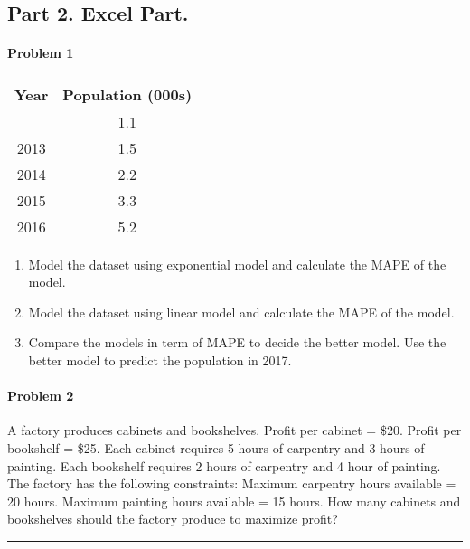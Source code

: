 \documentclass[
  letterpaper,
  DIV=11,
  numbers=noendperiod]{scrartcl}
\let\oldparagraph\paragraph
\renewcommand{\paragraph}[1]{\oldparagraph{#1}\mbox{}}
\providecommand{\tightlist}{%
  \setlength{\itemsep}{0pt}\setlength{\parskip}{0pt}}\usepackage{longtable,booktabs,array}
\begin{document}
\pagebreak

\subsection{Part 2. Excel Part.}\label{part-2.-excel-part.}

\paragraph{Problem 1}\label{problem-1}

\begin{longtable}[]{@{}cc@{}}
\toprule\noalign{}
Year & Population (000s) \\
\midrule\noalign{}
\endhead
\bottomrule\noalign{}
\endlastfoot
2012 & 1.1 \\
2013 & 1.5 \\
2014 & 2.2 \\
2015 & 3.3 \\
2016 & 5.2 \\
\end{longtable}

\begin{enumerate}
\def\labelenumi{\arabic{enumi}.}
\tightlist
\item
  Model the dataset using exponential model and calculate the MAPE of
  the model.
\item
  Model the dataset using linear model and calculate the MAPE of the
  model.
\item
  Compare the models in term of MAPE to decide the better model. Use the
  better model to predict the population in 2017.
\end{enumerate}

\paragraph{Problem 2}\label{problem-2}

A factory produces cabinets and bookshelves. Profit per cabinet = \$20.
Profit per bookshelf = \$25. Each cabinet requires 5 hours of carpentry
and 3 hours of painting. Each bookshelf requires 2 hours of carpentry
and 4 hour of painting. The factory has the following constraints:
Maximum carpentry hours available = 20 hours. Maximum painting hours
available = 15 hours. How many cabinets and bookshelves should the
factory produce to maximize profit?

\begin{center}\rule{0.5\linewidth}{0.5pt}\end{center}
\end{document}
